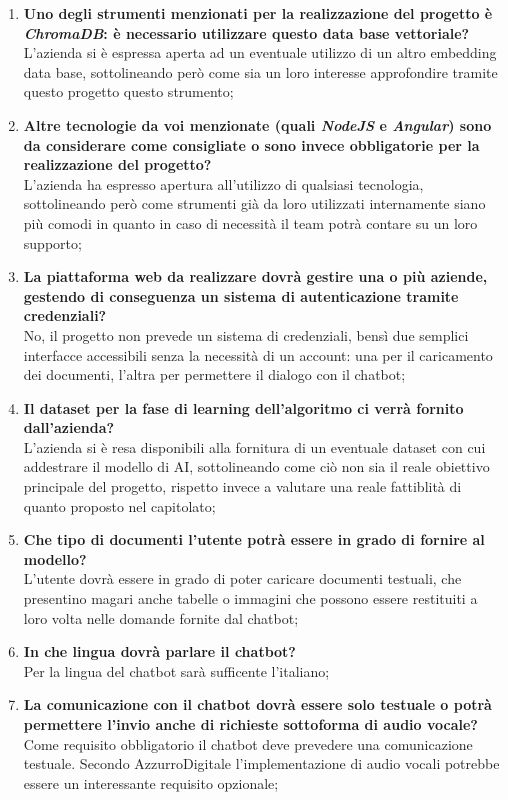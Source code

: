 \documentclass{article}
\begin{document}
\begin{paracol}{2}
\begin{enumerate}
    \item\textbf{Uno degli strumenti menzionati per la realizzazione del progetto è \textit{ChromaDB}: è necessario utilizzare questo data base vettoriale?} \\L'azienda si è espressa aperta ad un eventuale utilizzo di un altro embedding data base, sottolineando però come sia un loro interesse approfondire tramite questo progetto questo strumento;
    \item\textbf{Altre tecnologie da voi menzionate (quali \textit{NodeJS} e \textit{Angular}) sono da considerare come consigliate o sono invece obbligatorie per la realizzazione del progetto?}\\L'azienda ha espresso apertura all'utilizzo di qualsiasi tecnologia, sottolineando però come strumenti già da loro utilizzati internamente siano più comodi in quanto in caso di necessità il team potrà contare su un loro supporto;
    \item\textbf{La piattaforma web da realizzare dovrà gestire una o più aziende, gestendo di conseguenza un sistema di autenticazione tramite credenziali?} \\No, il progetto non prevede un sistema di credenziali, bensì due semplici interfacce accessibili senza la necessità di un account: una per il caricamento dei documenti, l'altra per permettere il dialogo con il chatbot;
    \item\textbf{Il dataset per la fase di learning dell'algoritmo ci verrà fornito dall'azienda?} \\L'azienda si è resa disponibili alla fornitura di un eventuale dataset con cui addestrare il modello di AI, sottolineando come ciò non sia il reale obiettivo principale del progetto, rispetto invece a valutare una reale fattiblità di quanto proposto nel capitolato;
    \item\textbf{Che tipo di documenti l'utente potrà essere in grado di fornire al modello?} \\L'utente dovrà essere in grado di poter caricare documenti testuali, che presentino magari anche tabelle o immagini che possono essere restituiti a loro volta nelle domande fornite dal chatbot;
    \item\textbf{In che lingua dovrà parlare il chatbot?} \\Per la lingua del chatbot sarà sufficente l'italiano;
    \item\textbf{La comunicazione con il chatbot dovrà essere solo testuale o potrà permettere l'invio anche di richieste sottoforma di audio vocale?} \\Come requisito obbligatorio il chatbot deve prevedere una comunicazione testuale. Secondo AzzurroDigitale l'implementazione di audio vocali potrebbe essere un interessante requisito opzionale;

\end{enumerate}
\end{paracol}
\end{document}
